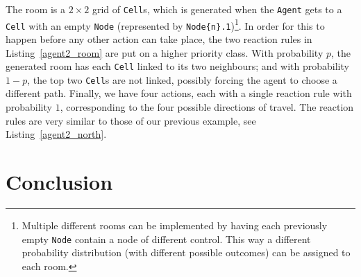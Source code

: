 \documentclass[runningheads]{llncs}
\begin{document}




The room is a $2 \times 2$ grid of \texttt{Cell}s, which is generated when the
\texttt{Agent} gets to a \texttt{Cell} with an empty \texttt{Node} (represented
by \texttt{Node\{n\}.1})\footnote{Multiple different rooms can be implemented by
having each previously empty \texttt{Node} contain a node of different control.
This way a different probability distribution (with different possible outcomes)
can be assigned to each room.}. In order for this to happen before any other
action can take place, the two reaction rules in Listing~\ref{agent2_room} are
put on a higher priority class. With probability $p$, the generated room has
each \texttt{Cell} linked to its two neighbours; and with probability $1-p$, the
top two \texttt{Cell}s are not linked, possibly forcing the agent to choose a
different path. Finally, we have four actions, each with a single reaction rule
with probability $1$, corresponding to the four possible directions of travel.
The reaction rules are very similar to those of our previous example, see
Listing~\ref{agent2_north}.

\section{Conclusion}



\end{document}

